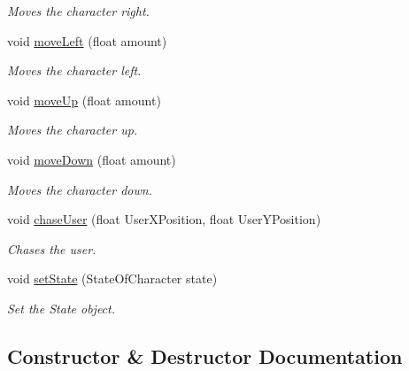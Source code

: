 \begin{DoxyCompactItemize}
\begin{DoxyCompactList}\small\item\em Moves the character right. \end{DoxyCompactList}\item 
void \mbox{\hyperlink{classMainCharacter_a88f2dac41fa25fb1f4711df6f81ee7c7}{move\+Left}} (float amount)
\begin{DoxyCompactList}\small\item\em Moves the character left. \end{DoxyCompactList}\item 
void \mbox{\hyperlink{classMainCharacter_a3de845aca47feb0ef968a03316c781bf}{move\+Up}} (float amount)
\begin{DoxyCompactList}\small\item\em Moves the character up. \end{DoxyCompactList}\item 
void \mbox{\hyperlink{classMainCharacter_a368e365aac35d854a4e156470f94ed0e}{move\+Down}} (float amount)
\begin{DoxyCompactList}\small\item\em Moves the character down. \end{DoxyCompactList}\item 
void \mbox{\hyperlink{classMainCharacter_aeb9d4174780f4cdc1901e9d0597b6da8}{chase\+User}} (float User\+X\+Position, float User\+Y\+Position)
\begin{DoxyCompactList}\small\item\em Chases the user. \end{DoxyCompactList}\item 
void \mbox{\hyperlink{classMainCharacter_a557d59154e4d12af391ee5d218b7dcc8}{set\+State}} (State\+Of\+Character state)
\begin{DoxyCompactList}\small\item\em Set the State object. \end{DoxyCompactList}\end{DoxyCompactItemize}


\subsection{Constructor \& Destructor Documentation}
\mbox{\label{classMainCharacter_a822c6796f6cac04dedfaa12846f1dd42}} 
